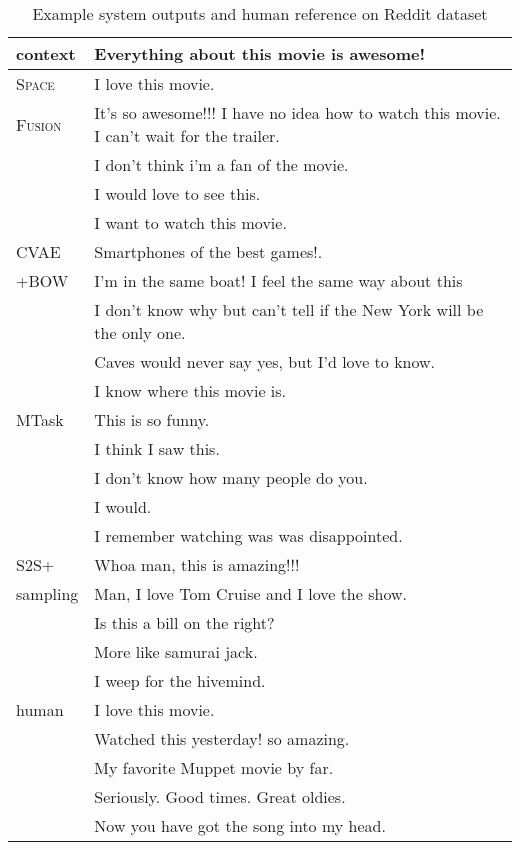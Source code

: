 \documentclass[11pt,a4paper]{article}
\begin{document}
\begin{table}[h]
    \centering
    \small
    \begin{tabular}{p{}|p{}} \hline 
    \textbf{context} & Everything about this movie is awesome!\\
    \hline
    \hline
    \textsc{Space}  &  I love this movie.\\
    \textsc{Fusion} &  It's so awesome!!! I have no idea how to watch this movie. I can't wait for the trailer.\\
        &  I don't think i'm a fan of the movie.\\ 
        &  I would love to see this.\\
        &  I want to watch this movie.\\
    \hline
    CVAE &   Smartphones of the best games!.\\
    +BOW    &  I'm in the same boat! I feel the same way about this\\
        &  I don't know why but can't tell if the New York will be the only one. \\
        &  Caves would never say yes, but I'd love to know.\\
        &  I know where this movie is. \\
    \hline
    MTask &  This is so funny. \\
        &  I think I saw this.  \\
        &  I don't know how many people do you. \\
        &  I would. \\
        &  I remember watching was was disappointed. \\
    \hline
    S2S+ &   Whoa man, this is amazing!!! \\
    sampling &   Man, I love Tom Cruise and I love the show. \\
        &  Is this a bill on the right? \\
        &  More like samurai jack. \\
        &  I weep for the hivemind. \\
    \hline
    human &  I love this movie.\\
        &  Watched this yesterday! so amazing. \\
        &  My favorite Muppet movie by far. \\
        &  Seriously. Good times. Great oldies. \\
        &  Now you have got the song into my head. \\
    \hline
    \end{tabular}
    \caption{Example system outputs and human reference on Reddit dataset}
    \label{table:example_reddit}
\end{table}
\end{document}
